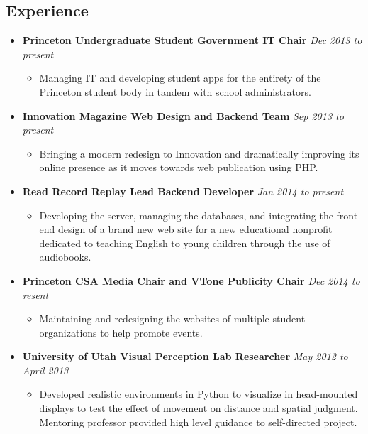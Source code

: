 \documentclass[11pt]{article}
\begin{document}
\subsection*{\textbf{Experience}}

\begin{itemize}[nolistsep,topsep=0pt, label=]
\item \textbf{Princeton Undergraduate Student Government IT Chair} \emph{Dec 2013 to present}
\begin{itemize}[nolistsep,topsep=0pt, label=]
\item Managing IT and developing student apps for the entirety of the Princeton student body in tandem with school administrators.
\end{itemize}

\item \textbf{Innovation Magazine Web Design and Backend Team} \emph{Sep 2013 to present}
\begin{itemize}[nolistsep,topsep=0pt, label=]
\item Bringing a modern redesign to Innovation and dramatically improving its online presence as it moves towards web publication using PHP.
\end{itemize}

\item \textbf{Read Record Replay Lead Backend Developer} \emph{Jan 2014 to present}
\begin{itemize}[nolistsep,topsep=0pt, label=]
\item Developing the server, managing the databases, and integrating the front end design of a brand new web site for a new educational nonprofit dedicated to teaching English to young children through the use of audiobooks.
\end{itemize}

\item \textbf{Princeton CSA Media Chair and VTone Publicity Chair} \emph{Dec 2014 to resent}
\begin{itemize}[nolistsep,topsep=0pt, label=]
\item Maintaining and redesigning the websites of multiple student organizations to help promote events.
\end{itemize}

\item \textbf{University of Utah Visual Perception Lab Researcher} \emph{May 2012 to April 2013}
\begin{itemize}[nolistsep,topsep=0pt, label=]
\item Developed realistic environments in Python to visualize in head-mounted displays to test the effect of movement on distance and spatial judgment. Mentoring professor provided high level guidance to self-directed project.
\end{itemize}


\end{itemize}
\end{document}
